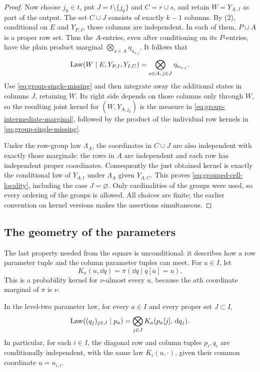 \begin{proof}
Now choose $j_0\in t$, put $J=t\setminus\{j_0\}$ and
$C=r\cup s$, and retain
$W=Y_{A,J}$ as part of the output.  The set $C\cup J$ consists of
exactly $k-1$ columns.  By (2), conditional on $E$ and $Y_{P,I}$,
those columns are independent.  In each of them, $P\cup A$ is a
proper row set.  Thus the $A$-entries, even after conditioning on its
$P$-entries, have the plain product marginal
$\bigotimes_{a\in A}\eta_{u_{a,j}}$.  It follows that
\begin{equation}\label{eq:group-intermediate-marginal}
 \operatorname{Law}(W\mid E,Y_{P,I},Y_{I,C})
 =\bigotimes_{a\in A,\,j\in J}\eta_{u_{a,j}}.
\end{equation}
Use \eqref{eq:group-single-missing} and then integrate away the
additional states in columns $J$, retaining $W$.  Its right side
depends on those columns only through $W$, so the resulting joint
kernel for $(W,Y_{A,j_0})$ is the measure in
\eqref{eq:group-intermediate-marginal}, followed by the product of the
individual row kernels in \eqref{eq:group-single-missing}.

Under the row-group law $\Lambda_A$, the coordinates in $C\cup J$
are also independent with exactly those marginals: the rows in $A$
are independent and each row has independent proper coordinates.
Consequently the just obtained kernel is exactly the conditional law
of $Y_{A,t}$ under $\Lambda_A$ given $Y_{A,C}$.  This proves
\eqref{eq:grouped-cell-locality}, including the case $J=\varnothing$.
Only cardinalities of the groups were used, so every ordering of the
groups is allowed.  All choices are finite; the earlier convention on
kernel versions makes the assertions simultaneous.
\end{proof}

\subsection{The geometry of the parameters}

The last property needed from the square is unconditional: it describes
how a row parameter tuple and the column parameter tuples can meet.
For $a\in I$, let
\begin{equation}\label{eq:parameter-coordinate-kernel}
 K_a(u,\dd q)=\pi(\dd q\mid q[a]=u).
\end{equation}
This is a probability kernel for $\nu$-almost every $u$, because the
$a$th coordinate marginal of $\pi$ is $\nu$.

\begin{lemma}\label{lem:parameter-geometry}
In the level-two parameter law, for every $a\in I$ and every proper
set $J\subset I$,
\begin{equation}\label{eq:parameter-geometry}
 \operatorname{Law}((q_j)_{j\in J}\mid p_a)
 =\bigotimes_{j\in J}K_a(p_a[j],\,\mathrm d q_j).
\end{equation}
In particular, for each $i\in I$, the diagonal row and column tuples
$p_i,q_i$ are conditionally independent, with the same law
$K_i(u,\cdot)$, given their common coordinate $u=u_{i,i}$.
\end{lemma}

